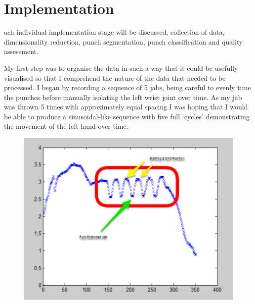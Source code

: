 %
%
\let\textcircled=\pgftextcircled
\chapter{Implementation}
\label{chap:intro}

ach individual implementation stage will be discussed, collection of data, dimensionality reduction, punch segmentation, punch classification and quality assessment.  



My first step was to organise the data in such a way that it could be usefully visualised so that I comprehend the nature of the data that needed to be processed. I began by recording a sequence of 5 jabs, being careful to evenly time the punches before manually isolating the left wrist joint over time. As my jab was thrown 5 times with approximately equal spacing I was hoping that I would be able to produce a sinusoidal-like sequence with five full `cycles' demonstrating the movement of the left hand over time.\newline

\begin{figure}[h]
    \centering
    \includegraphics[height=0.25\textheight]{fig04/lwrist.pdf}
    \label{fig:kinect}
\end{figure}


